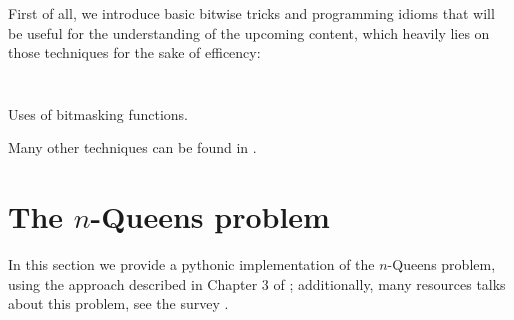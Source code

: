 

First of all, we introduce basic bitwise tricks and programming idioms that
will be useful for the understanding of the upcoming content, which heavily lies
on those techniques for the sake of efficency:
\inputminted[baselinestretch=0.8,stripnl=false]{python}{backtracking/bits_clean.py}
\begin{margintable}[-3cm]
\inputminted[baselinestretch=0.8,stripnl=false]{python}{backtracking/bits_clean_test.py}
\caption{Uses of bitmasking functions.}
\end{margintable}
Many other techniques can be found in \citep{Warren:2012:HD:2462741}.


\section{The $n$-Queens problem}

In this section we provide a pythonic implementation of the $n$-Queens problem,
using the approach described in Chapter $3$ of \citep{RuskeyCombGen}; additionally,
many resources talks about this problem, see the survey \citep{BELL20091}.

